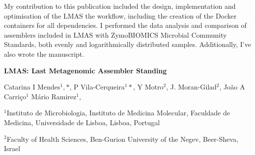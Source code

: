 My contribution to this publication included the design, implementation and optimisation of the LMAS the workflow, including the creation of the Docker containers for all dependencies. I performed the data analysis and comparison of assemblers included in LMAS with ZymoBIOMICS Microbial Community Standards, both evenly and logarithmically distributed samples. Additionally, I've also wrote the manuscript.

\cleardoublepage 

\begin{center}
\large
\textbf{LMAS: Last Metagenomic Assembler Standing}
\end{center}

Catarina I Mendes$^1,*$, 
P Vila-Cerqueira$^1*$,
Y Motro$^2$,
J. Moran-Gilad$^2$,
João A Carriço$^1$
Mário Ramirez$^1$, 


$^1$Instituto de Microbiologia, Instituto de Medicina Molecular, Faculdade de Medicina, Universidade de Lisboa, Lisboa, Portugal 

$^2$Faculty of Health Sciences, Ben-Gurion University of the Negev, Beer-Sheva, Israel



